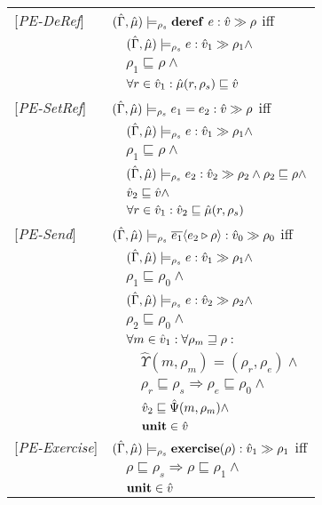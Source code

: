 \begin{tabular} {l l l l}
{[\textit{PE-DeRef}]}&\multicolumn{3}{l}{$(\hat{\Gamma},\hat{\mu}) \models_{\rho_s} \mathbf{deref}\ e : \hat{v} \gg \rho $ iff}\\
&&\multicolumn{2}{l}{$(\hat{\Gamma},\hat{\mu}) \models_{\rho_s} e : \hat{v}_{1} \gg \rho_{1} \wedge $}\\
&&\multicolumn{2}{l}{$\rho_1 \sqsubseteq \rho \wedge$ }\\
&&\multicolumn{2}{l}{$\forall r \in \hat{v}_1 : \hat{\mu}(r, \rho_s) \sqsubseteq \hat{v}$ }\\
{[\textit{PE-SetRef}]}&\multicolumn{3}{l}{$(\hat{\Gamma},\hat{\mu}) \models_{\rho_s} e_1 = e_2 : \hat{v} \gg \rho $ iff}\\
&&\multicolumn{2}{l}{$ (\hat{\Gamma},\hat{\mu}) \models_{\rho_s} e : \hat{v}_{1} \gg \rho_{1} \wedge $}\\
&&\multicolumn{2}{l}{$\rho_1 \sqsubseteq \rho \wedge$} \\
&&\multicolumn{2}{l}{$ (\hat{\Gamma},\hat{\mu}) \models_{\rho_s} e_2 : \hat{v}_{2} \gg \rho_{2} \wedge \rho_2 \sqsubseteq \rho \wedge$}\\
&&\multicolumn{2}{l}{$\hat{v}_2 \sqsubseteq \hat{v} \wedge$}\\
&&\multicolumn{2}{l}{$\forall r \in \hat{v}_1: \hat{v}_2 \sqsubseteq \hat{\mu}(r, \rho_s)$}\\
{[\textit{PE-Send}]}&\multicolumn{3}{l}{$(\hat{\Gamma},\hat{\mu}) \models_{\rho_s} \overline{e_1} \langle e_2 \triangleright \rho \rangle : \hat{v}_{0} \gg \rho_{0} $ iff}\\
&&\multicolumn{2}{l}{$ (\hat{\Gamma},\hat{\mu}) \models_{\rho_s} e : \hat{v}_{1} \gg \rho_{1} \wedge $}\\
&&\multicolumn{2}{l}{$ \rho_1 \sqsubseteq \rho_0 \wedge $}\\
&&\multicolumn{2}{l}{$ (\hat{\Gamma},\hat{\mu}) \models_{\rho_s} e : \hat{v}_{2} \gg \rho_{2} \wedge $}\\
&&\multicolumn{2}{l}{$ \rho_2 \sqsubseteq \rho_0 \wedge $}\\
&&\multicolumn{2}{l}{$ \forall m \in \hat{v}_1 : \forall \rho_m \sqsupseteq \rho:$}\\
&&&$\hat{\Upsilon}(m, \rho_m) = (\rho_r, \rho_e)\wedge $\\
&&&$\rho_r \sqsubseteq \rho_s \Rightarrow \rho_e \sqsubseteq \rho_0 \wedge$\\
&&&$\hat{v}_2 \sqsubseteq \hat{\Psi}(m, \rho_m) \wedge $\\
&&&$\mathbf{unit} \in \hat{v} $\\
{[\textit{PE-Exercise}]}&\multicolumn{3}{l}{$(\hat{\Gamma},\hat{\mu}) \models_{\rho_s} \mathbf{exercise}(\rho) : \hat{v}_{1} \gg \rho_{1} $ iff}\\
&&\multicolumn{2}{l}{$ \rho \sqsubseteq \rho_s \Rightarrow \rho \sqsubseteq \rho_1 \wedge $}\\
&&\multicolumn{2}{l}{$ \mathbf{unit} \in \hat{v}$}\\
\end{tabular}

